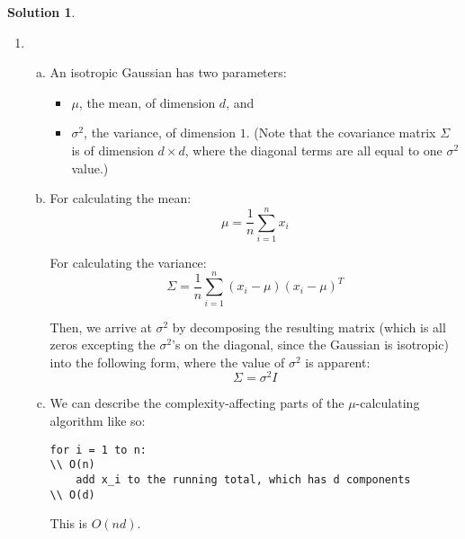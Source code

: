 \documentclass[letterpaper, 12pt]{article}
\theoremstyle{definition}
\newtheorem*{solution}{Solution}
\begin{document}
\begin{solution}\
	\begin{enumerate}[1.]
    	\item %
        	\begin{enumerate}[(a)]
            	\item An isotropic Gaussian has two parameters:
                	\begin{itemize}
                    	\item $\mu$, the mean, of dimension $d$, and
                        \item $\sigma^{2}$, the variance, of dimension $1$. (Note that the covariance matrix $\Sigma$ is of dimension $d \times d$, where the diagonal terms are all equal to one $\sigma^{2}$ value.)
                    \end{itemize}
                    
                 \item For calculating the mean:
                 	\begin{equation*}
						\mu = \frac{1}{n} \sum_{i=1}^{n} x_i
					\end{equation*}
                    
                 	For calculating the variance:
                    \begin{equation*}
						\Sigma = \frac{1}{n} \sum_{i=1}^{n} (x_i - \mu) (x_i - \mu)^T 
					\end{equation*}
                    
                    Then, we arrive at $\sigma^{2}$ by decomposing the resulting matrix (which is all zeros excepting the $\sigma^{2}$'s on the diagonal, since the Gaussian is isotropic) into the following form, where the value of $\sigma^{2}$ is apparent:
                    \begin{equation*}
                    	\Sigma = \sigma^{2} I
                    \end{equation*}
                    
                  \item We can describe the complexity-affecting parts of the $\mu$-calculating algorithm like so:
\lstset{language=} %
\begin{lstlisting}
for i = 1 to n:																				\\ O(n)
	add x_i to the running total, which has d components		\\ O(d)
\end{lstlisting}
					This is $O(nd)$.
                

\end{enumerate}
\end{enumerate}
\end{solution}
\end{document}
